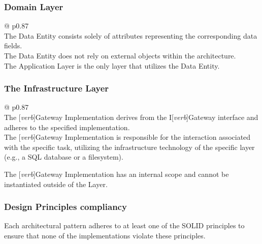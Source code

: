 \subsubsection*{Domain Layer}

\begin{table}[H]
    \begin{tabular}{@{\makebox[2em][c]{\rownumber\space}}  p{0.87\linewidth}}
        \\ 
    \hline
    The Data Entity consists solely of attributes representing the corresponding data
    fields. \\

    The Data Entity does not rely on external objects within the architecture. \\
    
    The Application Layer is the only layer that utilizes the Data Entity. \\
    \hline
    \end{tabular}
\caption{RequestModel Requirements}
\label{table_requirements_requestmodel}
\end{table}

\subsubsection*{The Infrastructure Layer}

\begin{table}[H]
    \begin{tabular}{@{\makebox[2em][c]{\rownumber\space}}  p{0.87\linewidth}}
        \\ 
    \hline
    The [\textit{\gls{verb}}]Gateway Implementation derives from the I[\textit{\gls{verb}}]Gateway interface
    and adheres to the specified implementation. \\

    The [\textit{\gls{verb}}]Gateway Implementation is responsible for the interaction
    associated with the specific task, utilizing the infrastructure technology of the
    specific layer (e.g., a SQL database or a filesystem).
    
    The [\textit{\gls{verb}}]Gateway Implementation has an internal scope and cannot be
    instantiated outside of the Layer. \\
    \hline
    \end{tabular}
\caption{\textit{[\gls{verb}]}Gateway Implementation Requirements}
\label{table_requirements_gatewayimplementation}
\end{table}

\subsubsection*{Design Principles compliancy}
Each architectural pattern adheres to at least one of the SOLID principles to ensure that
none of the implementations violate these principles.